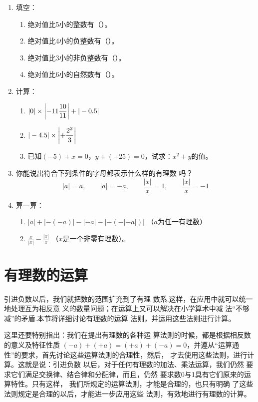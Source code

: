 \begin{enumerate}
\item 填空：
\begin{enumerate}
    \item 绝对值比5小的整数有（\qquad \qquad ）。
    \item 绝对值比4小的负整数有（\qquad \qquad ）。
    \item 绝对值比3小的非负整数有（\qquad \qquad ）。
    \item 绝对值比6小的自然数有（\qquad \qquad ）。
\end{enumerate}


\item 计算：
\begin{enumerate}
    \item $|0|\times \left|-11\dfrac{10}{11}\right|+|-0.5|$
    \item $|-4.5|\times\left|+\dfrac{2^2}{3}\right|$
    \item 已知$(-5)+x=0$，$y+(+25)=0$，试求：$x^2+y$的值。
\end{enumerate}

\item 你能说出符合下列条件的字母都表示什么样的有理数
吗？
\[|a|=a,\qquad |a|=-a,\qquad \frac{|x|}{x}=1,\qquad \frac{|x|}{x}=-1  \]

\item 算一算：
\begin{enumerate}
    \item $|a|+|-(-a)|-|-a|-|-(-|-a|)|$ （$a$为任一有理数）
    \item $\frac{x}{|x|}-\frac{|x|}{x}$ （$x$是一个非零有理数）。
\end{enumerate}

\end{enumerate}

\section{有理数的运算}
引进负数以后，我们就把数的范围扩充到了有理
数系.这样，在应用中就可以统一地处理互为相反意
义的数量问题；在运算上又可以解决在小学算术中减
法“不够减”的矛盾.本节将详细讨论有理数的运算
法则，并运用这些法则进行计算。

    这里还要特别指出：我们在提出有理数的各种运
算法则的时候，都是根据相反数的意义及特征性质
 $ (-a) + ( + a)=(+a)+(-a) = 0$，并遵从“运算通
性”的要求，首先讨论这些运算法则的合理性，然后，
才去使用这些法则，进行计算。这就是说：引进负数
以后，对于任何有理数的加法、乘法运算，我们仍然
要求它们满足交换律、结合律和分配律，而且，仍然
要求数0与1具有它们原来的运算特性。只有这样，
我们所规定的运算法则，才能是合理的，也只有明确
了这些法则规定是合理的以后，才能进一步应用这些
法则，有效地进行有理数的计算。

